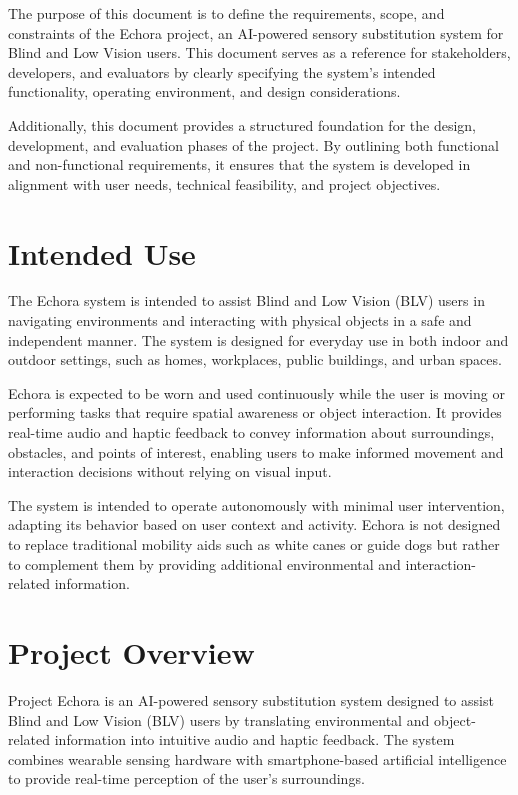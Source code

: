 The purpose of this document is to define the requirements, scope, and constraints of the Echora project, an AI-powered sensory substitution system for Blind and Low Vision users. This document serves as a reference for stakeholders, developers, and evaluators by clearly specifying the system’s intended functionality, operating environment, and design considerations.

Additionally, this document provides a structured foundation for the design, development, and evaluation phases of the project. By outlining both functional and non-functional requirements, it ensures that the system is developed in alignment with user needs, technical feasibility, and project objectives.

\section{Intended Use}

The Echora system is intended to assist Blind and Low Vision (BLV) users in navigating environments and interacting with physical objects in a safe and independent manner. The system is designed for everyday use in both indoor and outdoor settings, such as homes, workplaces, public buildings, and urban spaces.

Echora is expected to be worn and used continuously while the user is moving or performing tasks that require spatial awareness or object interaction. It provides real-time audio and haptic feedback to convey information about surroundings, obstacles, and points of interest, enabling users to make informed movement and interaction decisions without relying on visual input.

The system is intended to operate autonomously with minimal user intervention, adapting its behavior based on user context and activity. Echora is not designed to replace traditional mobility aids such as white canes or guide dogs but rather to complement them by providing additional environmental and interaction-related information.

\section{Project Overview}

Project Echora is an AI-powered sensory substitution system designed to assist Blind and Low Vision (BLV) users by translating environmental and object-related information into intuitive audio and haptic feedback. The system combines wearable sensing hardware with smartphone-based artificial intelligence to provide real-time perception of the user’s surroundings.

